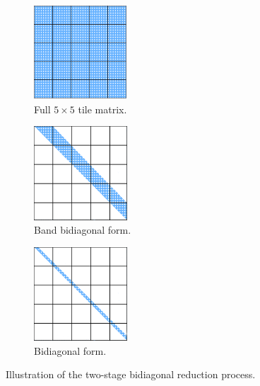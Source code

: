 \begin{figure}[h!]
  \begin{subfigure}[t]{0.3 \textwidth}
    \includegraphics[width=3.5cm, height=3.5cm]{fig/SVD_1_grid}
    \caption{\label{fig:SVD_initial}Full $5\times 5$ tile matrix.}
  \end{subfigure}
  \hfill
  \begin{subfigure}[t]{0.3 \textwidth}
    \includegraphics[width=3.5cm, height=3.5cm]{fig/SVD_band_bidiag}
    \caption{\label{fig:SVD_band_bidiag}
     Band bidiagonal form.}
  \end{subfigure}
  \hfill
    \begin{subfigure}[t]{0.3 \textwidth}
    \includegraphics[width=3.5cm, height=3.5cm]{fig/SVD_bidiag}
    \caption{\label{fig:SVD_bidiag}
     Bidiagonal form.}
    \end{subfigure}
    \caption{Illustration of the two-stage bidiagonal reduction process.}
    \label{fig:two_stage}
\end{figure}
